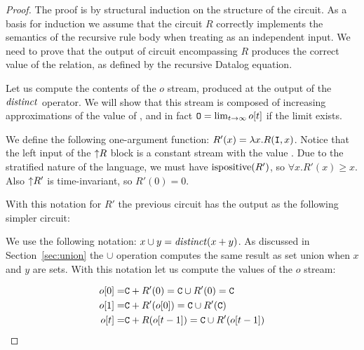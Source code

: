 \begin{proof}
The proof is by structural induction on the structure of the circuit.
As a basis for induction we assume that the circuit $R$ correctly implements
the semantics of the recursive rule body when treating  as an
independent input.  We need to prove that the output of circuit encompassing
$R$ produces the correct value of the  relation, as defined by
the recursive Datalog equation.

Let us compute the contents of the $o$ stream, produced at the output
of the $\mathit{distinct}$ operator.  We will show that this stream is composed
of increasing approximations of the value of , and in fact
$\mbox{\texttt{O}} = \lim_{t \to \infty} o[t]$ if the limit exists.

We define the following one-argument function: $R'(x) = \lambda x . R(\mbox{\texttt{I}}, x)$.
Notice that the left input of the ${\uparrow}R$ block is a constant stream
with the value .  Due to the stratified nature of the language,
we must have $\mbox{ispositive}(R')$, so $\forall x . R'(x) \geq x$.
Also ${\uparrow}R'$ is time-invariant, so $R'(0) = 0$.

With this notation for $R'$ the previous circuit has the
output as the following simpler circuit:

\begin{center}
\end{center}

We use the following notation: $x \cup y = \mathit{distinct}(x + y)$.  As discussed in Section~\ref{sec:union}
the $\cup$ operation computes the same result as set union when $x$ and $y$ are sets.
With this notation let us compute the values of the $o$ stream:

$$
\begin{aligned}
o[0] =& \mbox{\texttt{C}} + R'(0) = \mbox{\texttt{C}} \cup R'(0) = \mbox{\texttt{C}} \\
o[1] =& \mbox{\texttt{C}} + R'(o[0]) = \mbox{\texttt{C}} \cup R'(\mbox{\texttt{C}}) \\
o[t] =& \mbox{\texttt{C}} + R(o[t-1]) = \mbox{\texttt{C}} \cup R'(o[t-1]) \\
\end{aligned}
$$


\end{proof}
